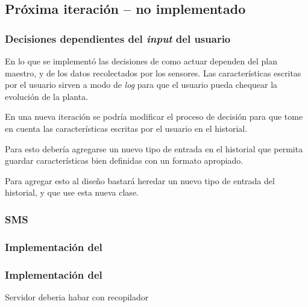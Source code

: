     \subsection{Pr\'oxima iteraci\'on -- no implementado}
      \subsubsection{Decisiones dependientes del \textit{input} del usuario}
        En lo que se implement\'o las decisiones de como actuar dependen del plan
        maestro, y de los datos recolectados por los sensores.
        Las caracter\'isticas escritas por el usuario sirven a modo de \textit{log}
        para que el usuario pueda chequear la evoluci\'on de la planta.

        En una nueva iteraci\'on se podr\'ia modificar el proceso de decisi\'on para
        que tome en cuenta las caracter\'isticas escritas por el usuario en el
        historial.

        Para esto deber\'ia agregarse un nuevo tipo de entrada en el historial
        que permita guardar caracter\'isticas bien definidas con un formato apropiado.

        Para agregar esto al dise\~no bastar\'a heredar un nuevo tipo de entrada
        del historial, y que \decisiones{} use esta nueva clase.

      \subsubsection{SMS}

      \subsubsection{Implementaci\'on del \calibrador{}}

      \subsubsection{Implementaci\'on del \recopilador{}}
        Servidor deberia habar con recopilador

